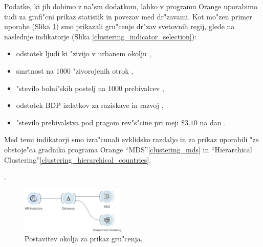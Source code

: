 Podatke, ki jih dobimo z na"sm dodatkom, lahko v programu Orange uporabimo tudi
za grafi"cni prikaz statistik in povezav med dr"zavami. Kot mo"zen primer
uporabe (Slika \ref{clustering_setup}) smo prikazali gru"cenje dr"zav svetovnih regij, glede na naslednje
indikatorje (Slika \ref{clustering_indicator_selection}):
\begin{itemize}
  \item odstotek ljudi ki "zivijo v urbanem okolju 
    ,
  \item smrtnost na $1000$ "zivorojenih otrok
    ,
  \item "stevilo bolni"skih postelj na $1000$ prebivalcev
    ,
  \item odstotek BDP izdatkov za raziskave in razvoj
    ,
  \item "stevilo prebivalstva pod pragom rev"s"cine pri meji $\$3.10$ na dan
    .
\end{itemize}
Med temi indikatorji smo izra"cunali evklidsko razdaljo in za prikaz 
uporabili "ze obstoje"ca gradnika programa Orange
``MDS''\ref{clustering_mds} in
``Hierarchical Clustering''\ref{clustering_hierarchical_countries}.



. 


\begin{figure}
\begin{center}
\includegraphics[width=5cm]{pic/clustering_setup.png}
\end{center}
\caption{Postavitev okolja za prikaz gru"cenja.}
\label{clustering_setup}
\end{figure} 

